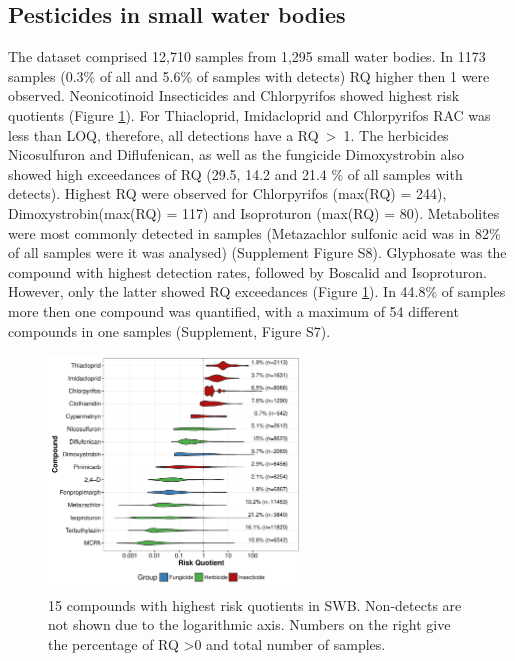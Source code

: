 \documentclass[journal=esthag,manuscript=article]{achemso}
\begin{document}
\subsection{Pesticides in small water bodies}
The dataset comprised 12,710 samples from 1,295 small water bodies.
In 1173 samples (0.3\% of all and 5.6\% of samples with detects) RQ higher then 1 were observed.
Neonicotinoid Insecticides and Chlorpyrifos showed highest risk quotients (Figure \ref{fig:fig6}).
For Thiacloprid, Imidacloprid and Chlorpyrifos RAC was less than LOQ, therefore, all detections have a RQ~\textgreater~1. 
The herbicides Nicosulfuron and Diflufenican, as well as the fungicide Dimoxystrobin also showed high exceedances of RQ (29.5, 14.2 and 21.4 \% of all samples with detects).
Highest RQ were observed for Chlorpyrifos (max(RQ) = 244), Dimoxystrobin(max(RQ) = 117) and Isoproturon (max(RQ) = 80). 
Metabolites were most commonly detected in samples (Metazachlor sulfonic acid was in 82\% of all samples were it was analysed) (Supplement Figure S8).
Glyphosate was the compound with highest detection rates, followed by Boscalid and Isoproturon. 
However, only the latter showed RQ exceedances (Figure \ref{fig:fig6}).
In 44.8\% of samples more then one compound was quantified, with a maximum of 54 different compounds in one samples (Supplement, Figure S7). 

\begin{figure}[ht]
  \includegraphics[width=0.6\textwidth]{figure6.pdf}
  \caption{15 compounds with highest risk quotients in SWB. Non-detects are not shown due to the logarithmic axis. Numbers on the right give the percentage of RQ \textgreater 0 and total number of samples.
  }
  \label{fig:fig6}
\end{figure}




\end{document}
